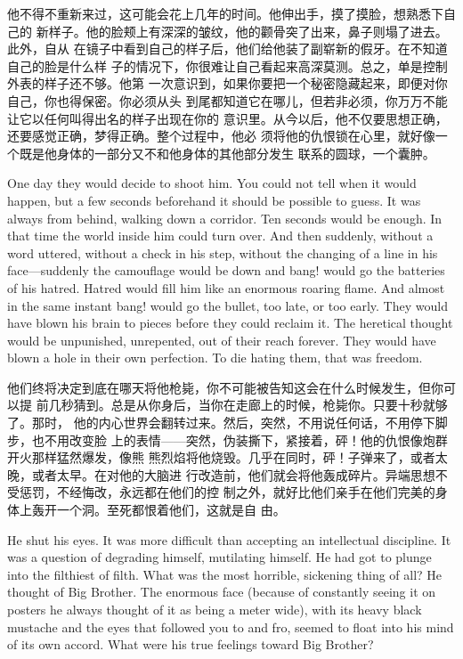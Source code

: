 \begin{paracol}{2}
\switchcolumn

他不得不重新来过，这可能会花上几年的时间。他伸出手，摸了摸脸，想熟悉下自己的
新样子。他的脸颊上有深深的皱纹，他的颧骨突了出来，鼻子则塌了进去。此外，自从
在镜子中看到自己的样子后，他们给他装了副崭新的假牙。在不知道自己的脸是什么样
子的情况下，你很难让自己看起来高深莫测。总之，单是控制外表的样子还不够。他第
一次意识到，如果你要把一个秘密隐藏起来，即便对你自己，你也得保密。你必须从头
到尾都知道它在哪儿，但若非必须，你万万不能让它以任何叫得出名的样子出现在你的
意识里。从今以后，他不仅要思想正确，还要感觉正确，梦得正确。整个过程中，他必
须将他的仇恨锁在心里，就好像一个既是他身体的一部分又不和他身体的其他部分发生
联系的圆球，一个囊肿。

\switchcolumn*

One day they would decide to shoot him. You could not tell when it would
happen, but a few seconds beforehand it should be possible to guess. It
was always from behind, walking down a corridor. Ten seconds would be
enough. In that time the world inside him could turn over. And then
suddenly, without a word uttered, without a check in his step, without
the changing of a line in his face---suddenly the camouflage would be
down and bang! would go the batteries of his hatred. Hatred would fill
him like an enormous roaring flame. And almost in the same instant bang!
would go the bullet, too late, or too early. They would have blown his
brain to pieces before they could reclaim it. The heretical thought
would be unpunished, unrepented, out of their reach forever. They would
have blown a hole in their own perfection. To die hating them, that was
freedom.

\switchcolumn

他们终将决定到底在哪天将他枪毙，你不可能被告知这会在什么时候发生，但你可以提
前几秒猜到。总是从你身后，当你在走廊上的时候，枪毙你。只要十秒就够了。那时，
他的内心世界会翻转过来。然后，突然，不用说任何话，不用停下脚步，也不用改变脸
上的表情——突然，伪装撕下，紧接着，砰！他的仇恨像炮群开火那样猛然爆发，像熊
熊烈焰将他烧毁。几乎在同时，砰！子弹来了，或者太晚，或者太早。在对他的大脑进
行改造前，他们就会将他轰成碎片。异端思想不受惩罚，不经悔改，永远都在他们的控
制之外，就好比他们亲手在他们完美的身体上轰开一个洞。至死都恨着他们，这就是自
由。

\switchcolumn*

He shut his eyes. It was more difficult than accepting an intellectual
discipline. It was a question of degrading himself, mutilating himself.
He had got to plunge into the filthiest of filth. What was the most
horrible, sickening thing of all? He thought of Big Brother. The
enormous face (because of constantly seeing it on posters he always
thought of it as being a meter wide), with its heavy black mustache and
the eyes that followed you to and fro, seemed to float into his mind of
its own accord. What were his true feelings toward Big Brother?


\end{paracol}
